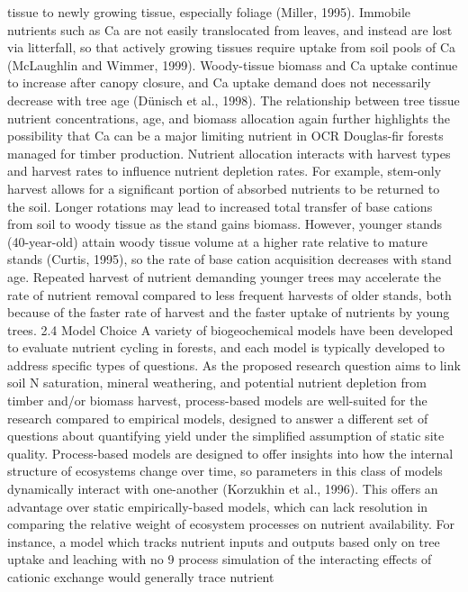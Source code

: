 \documentclass{article}
\begin{document}
tissue to newly growing tissue, especially foliage (Miller, 1995). Immobile nutrients such as Ca
are not easily translocated from leaves, and instead are lost via litterfall, so that actively growing
tissues require uptake from soil pools of Ca (McLaughlin and Wimmer, 1999). Woody-tissue
biomass and Ca uptake continue to increase after canopy closure, and Ca uptake demand does
not necessarily decrease with tree age (Dünisch et al., 1998). The relationship between tree tissue
nutrient concentrations, age, and biomass allocation again further highlights the possibility that
Ca can be a major limiting nutrient in OCR Douglas-fir forests managed for timber production.
Nutrient allocation interacts with harvest types and harvest rates to influence nutrient depletion
rates. For example, stem-only harvest allows for a significant portion of absorbed nutrients to be
returned to the soil. Longer rotations may lead to increased total transfer of base cations from
soil to woody tissue as the stand gains biomass. However, younger stands (40-year-old) attain
woody tissue volume at a higher rate relative to mature stands (Curtis, 1995), so the rate of base
cation acquisition decreases with stand age. Repeated harvest of nutrient demanding younger
trees may accelerate the rate of nutrient removal compared to less frequent harvests of older
stands, both because of the faster rate of harvest and the faster uptake of nutrients by young trees.
2.4 Model Choice
A variety of biogeochemical models have been developed to evaluate nutrient cycling in forests,
and each model is typically developed to address specific types of questions. As the proposed
research question aims to link soil N saturation, mineral weathering, and potential nutrient
depletion from timber and/or biomass harvest, process-based models are well-suited for the
research compared to empirical models, designed to answer a different set of questions about
quantifying yield under the simplified assumption of static site quality. Process-based models are
designed to offer insights into how the internal structure of ecosystems change over time, so
parameters in this class of models dynamically interact with one-another (Korzukhin et al.,
1996). This offers an advantage over static empirically-based models, which can lack resolution
in comparing the relative weight of ecosystem processes on nutrient availability. For instance, a
model which tracks nutrient inputs and outputs based only on tree uptake and leaching with no 
9
process simulation of the interacting effects of cationic exchange would generally trace nutrient
\end{document}
